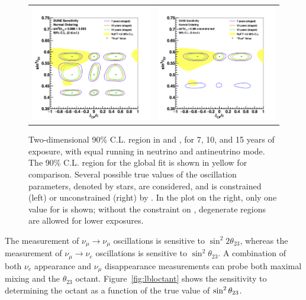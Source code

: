 \begin{figure}[h!]
    \centering
    \begin{tabular}{cc}
		\includegraphics[width=0.475\linewidth]{graphics/bubbles_q23_2019_v4.png} &
		\includegraphics[width=0.475\linewidth]{graphics/bubbles_q23_nopen_2019_v4.png} 
	\end{tabular}  
	\caption[Two-dimensional 90\% C.L. region in  and \deltacp]{Two-dimensional 90\% C.L. region in  and \deltacp, for 7, 10, and 15 years of exposure, with equal running in neutrino and antineutrino mode. The 90\% C.L. region for the  global fit is shown in yellow for comparison. Several possible true values of the oscillation parameters, denoted by stars, are considered, and  is constrained (left) or unconstrained (right) by . In the plot on the right, only one value for  is shown; without the constraint on , degenerate regions are allowed for lower exposures.}
    \label{fig:res_th23vdcp_degen}
\end{figure}

The measurement of $\nu_\mu \rightarrow \nu_\mu$ oscillations is sensitive to $\sin ^2 2 \theta_{23}$, whereas the measurement of $\nu_\mu \rightarrow \nu_e$ oscillations is sensitive to $\sin^2 \theta_{23}$.  A combination of both $\nu_e$ appearance and $\nu_\mu$ disappearance measurements can probe both maximal mixing and
the $\theta_{23}$ octant.  
Figure~\ref{fig:lbloctant} shows the sensitivity to determining the octant as a function of the true value of $\sin^2\theta_{23}$.

